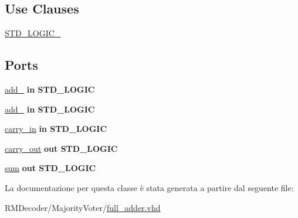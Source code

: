 \subsection*{Use Clauses}
 \begin{DoxyCompactItemize}
\item 
\hypertarget{classfull__adder_gaa4b2b25246a821511120e3149b003563}{\hyperlink{group___majority_voter_gaa4b2b25246a821511120e3149b003563}{S\+T\+D\+\_\+\+L\+O\+G\+I\+C\+\_}   }\label{classfull__adder_gaa4b2b25246a821511120e3149b003563}

\end{DoxyCompactItemize}
\subsection*{Ports}
 \begin{DoxyCompactItemize}
\item 
\hypertarget{classfull__adder_ga3d6cfc8eb92a4fa7bd17df688efa5522}{\hyperlink{group___majority_voter_ga3d6cfc8eb92a4fa7bd17df688efa5522}{add\+\_}  {\bfseries {\bfseries \textcolor{vhdlchar}{in}\textcolor{vhdlchar}{ }}} {\bfseries \textcolor{vhdlchar}{S\+T\+D\+\_\+\+L\+O\+G\+I\+C}\textcolor{vhdlchar}{ }} }\label{classfull__adder_ga3d6cfc8eb92a4fa7bd17df688efa5522}

\item 
\hypertarget{classfull__adder_gaf7639b8ec31b7bb5b1d72d1796d5833e}{\hyperlink{group___majority_voter_gaf7639b8ec31b7bb5b1d72d1796d5833e}{add\+\_}  {\bfseries {\bfseries \textcolor{vhdlchar}{in}\textcolor{vhdlchar}{ }}} {\bfseries \textcolor{vhdlchar}{S\+T\+D\+\_\+\+L\+O\+G\+I\+C}\textcolor{vhdlchar}{ }} }\label{classfull__adder_gaf7639b8ec31b7bb5b1d72d1796d5833e}

\item 
\hypertarget{classfull__adder_gab93e0e530f7cfe8f44daa9285209cca1}{\hyperlink{group___majority_voter_gab93e0e530f7cfe8f44daa9285209cca1}{carry\+\_\+in}  {\bfseries {\bfseries \textcolor{vhdlchar}{in}\textcolor{vhdlchar}{ }}} {\bfseries \textcolor{vhdlchar}{S\+T\+D\+\_\+\+L\+O\+G\+I\+C}\textcolor{vhdlchar}{ }} }\label{classfull__adder_gab93e0e530f7cfe8f44daa9285209cca1}

\item 
\hypertarget{classfull__adder_gafcc7c006376592bcf77bccdcfd0a99bc}{\hyperlink{group___majority_voter_gafcc7c006376592bcf77bccdcfd0a99bc}{carry\+\_\+out}  {\bfseries {\bfseries \textcolor{vhdlchar}{out}\textcolor{vhdlchar}{ }}} {\bfseries \textcolor{vhdlchar}{S\+T\+D\+\_\+\+L\+O\+G\+I\+C}\textcolor{vhdlchar}{ }} }\label{classfull__adder_gafcc7c006376592bcf77bccdcfd0a99bc}

\item 
\hypertarget{classfull__adder_ga869bdd6b2525c2745b2cc24818de1a72}{\hyperlink{group___majority_voter_ga869bdd6b2525c2745b2cc24818de1a72}{sum}  {\bfseries {\bfseries \textcolor{vhdlchar}{out}\textcolor{vhdlchar}{ }}} {\bfseries \textcolor{vhdlchar}{S\+T\+D\+\_\+\+L\+O\+G\+I\+C}\textcolor{vhdlchar}{ }} }\label{classfull__adder_ga869bdd6b2525c2745b2cc24818de1a72}

\end{DoxyCompactItemize}


La documentazione per questa classe è stata generata a partire dal seguente file\+:\begin{DoxyCompactItemize}
\item 
R\+M\+Decoder/\+Majority\+Voter/\hyperlink{full__adder_8vhd}{full\+\_\+adder.\+vhd}\end{DoxyCompactItemize}
